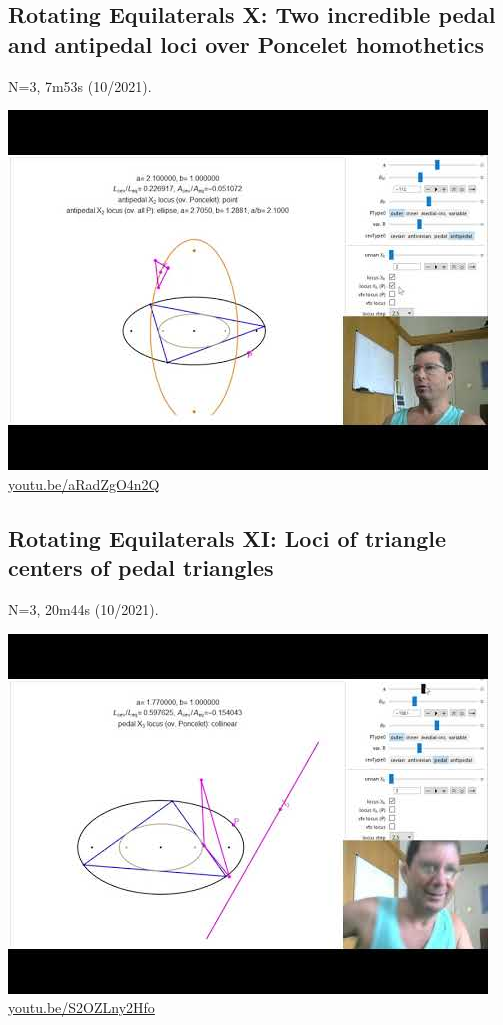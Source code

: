 \documentclass[12pt]{amsart}
\begin{document}
\subsection{Rotating Equilaterals X: Two incredible pedal and antipedal loci over Poncelet homothetics}
\label{vid:aRadZgO4n2Q}
\noindent N=3, 7m53s (10/2021). 
\begin{center}\includegraphics[width=.5\textwidth]{pics/aRadZgO4n2Q.jpg} \\ 
\href{https://youtu.be/aRadZgO4n2Q}{\url{youtu.be/aRadZgO4n2Q}}\end{center}
% 

\subsection{Rotating Equilaterals XI: Loci of triangle centers of pedal triangles}
\label{vid:S2OZLny2Hfo}
\noindent N=3, 20m44s (10/2021). 
\begin{center}\includegraphics[width=.5\textwidth]{pics/S2OZLny2Hfo.jpg} \\ 
\href{https://youtu.be/S2OZLny2Hfo}{\url{youtu.be/S2OZLny2Hfo}}\end{center}
% 
\end{document}
